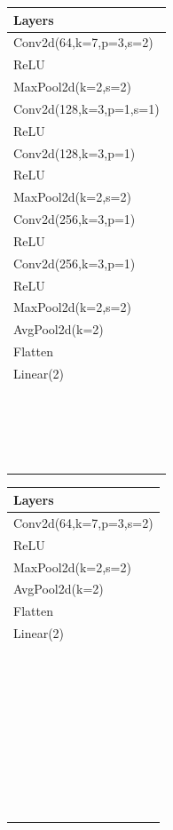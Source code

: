 \documentclass[sigconf,nonacm]{acmart}
\begin{document}
\begin{figure}[ht]
  \begin{subfigure}[t]{0.3\columnwidth}
    \scriptsize
    \begin{tabular}{l}
      Layers \\
      \hline
      Conv2d(64,k=7,p=3,s=2) \\
      ReLU  \\
      MaxPool2d(k=2,s=2) \\
      Conv2d(128,k=3,p=1,s=1) \\
      ReLU \\
      Conv2d(128,k=3,p=1)  \\
      ReLU \\
      MaxPool2d(k=2,s=2) \\
      Conv2d(256,k=3,p=1) \\
      ReLU \\
      Conv2d(256,k=3,p=1) \\
      ReLU \\
      MaxPool2d(k=2,s=2) \\
      AvgPool2d(k=2) \\
      Flatten \\
      Linear(2) \\
      ~\\
      ~\\
      ~\\
      ~\\
    \end{tabular}
  \end{subfigure}
  \begin{subfigure}[t]{0.3\columnwidth}
    \scriptsize
    \begin{tabular}{l}
      Layers \\
      \hline
      Conv2d(64,k=7,p=3,s=2) \\
      ReLU  \\
      MaxPool2d(k=2,s=2) \\
      AvgPool2d(k=2) \\
      Flatten \\
      Linear(2) \\
      ~\\
      ~\\
      ~\\
      ~\\
      ~\\
      ~\\
      ~\\
      ~\\

\end{tabular}
\end{subfigure}
\end{figure}
\end{document}
